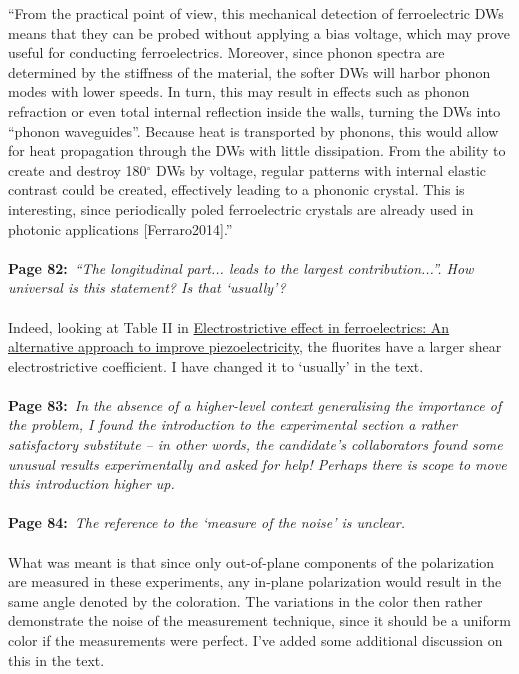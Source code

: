 \documentclass[a4, UTF8]{article}
\begin{document}
``From the practical point of view, this mechanical detection of ferroelectric DWs means that they can be probed without applying a bias voltage, which may prove useful for conducting ferroelectrics. Moreover, since phonon spectra are determined by the stiffness of the material, the softer DWs will harbor phonon modes with lower speeds. In turn, this may result in effects such as phonon refraction or even total internal reflection inside the walls, turning the DWs into ``phonon waveguides''. Because heat is transported by phonons, this would allow for heat propagation through the DWs with little dissipation. From the ability to create and destroy 180$^\circ$ DWs by voltage, regular patterns with internal elastic contrast could be created, effectively leading to a phononic crystal.
This is interesting, since periodically poled ferroelectric crystals are already used in photonic applications [Ferraro2014].''
\\\\
{\bf Page 82:}~{\it ``The longitudinal part... leads to the largest contribution...''. How universal is this statement? Is that `usually'?}
\\\\
Indeed, looking at Table II in \href{http://dx.doi.org/10.1063/1.4861260}{Electrostrictive effect in ferroelectrics: An alternative approach to improve piezoelectricity}, the fluorites have a larger shear electrostrictive coefficient. I have changed it to `usually' in the text.
\\\\
{\bf Page 83:}~{\it In the absence of a higher-level context generalising the importance of the problem, I found the introduction to the experimental section a rather satisfactory substitute – in other words, the candidate’s collaborators found some unusual results experimentally and asked for help!
Perhaps there is scope to move this introduction higher up.}
\\\\
{\bf Page 84:}~{\it The reference to the `measure of the noise’ is unclear.}
\\\\
What was meant is that since only out-of-plane components of the polarization are measured in these experiments, any in-plane polarization would result in the same angle denoted by the coloration. The variations in the color then rather demonstrate the noise of the measurement technique, since it should be a uniform color if the measurements were perfect. I've added some additional discussion on this in the text.
\end{document}
